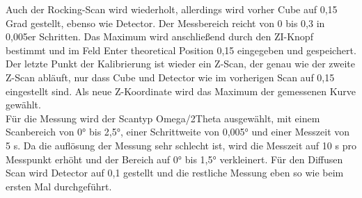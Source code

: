 Auch der Rocking-Scan wird wiederholt, allerdings wird vorher \glqq Cube\grqq{} auf 0,15 Grad gestellt, ebenso wie \glqq Detector\grqq{}.
Der Messbereich reicht von 0 bis 0,3 in 0,005er Schritten. Das Maximum wird anschließend durch den \glqq ZI\grqq{}-Knopf bestimmt 
und im Feld \glqq Enter theoretical Position\grqq{} 0,15 eingegeben und gespeichert.\\

Der letzte Punkt der Kalibrierung ist wieder ein Z-Scan, der genau wie der zweite Z-Scan abläuft, 
nur dass \glqq Cube\grqq{} und \glqq Detector\grqq{} wie im vorherigen Scan auf 0,15 eingestellt sind.
Als neue Z-Koordinate wird das Maximum der gemessenen Kurve gewählt.\\

Für die Messung wird der \glqq Scantyp\grqq{} \glqq Omega/2Theta\grqq{} ausgewählt, mit einem Scanbereich von 0° bis 2,5°, einer Schrittweite von 0,005° und einer 
Messzeit von 5 s. Da die auflösung der Messung sehr schlecht ist, wird die Messzeit auf 10 s pro Messpunkt erhöht und der Bereich auf 0° bis 1,5° verkleinert.
Für den \glqq Diffusen Scan\grqq{} wird \glqq Detector\grqq{} auf 0,1 gestellt und die restliche Messung eben so wie beim ersten Mal durchgeführt.



